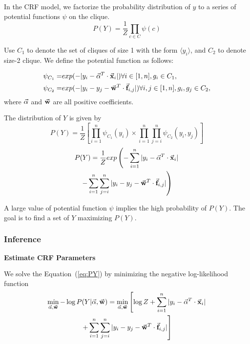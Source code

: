In the CRF model, we factorize the probability distribution of $y$ to a series of potential functions $\psi$ on the clique. 
\begin{equation}
	P(Y) = \frac{1}{Z} \prod_{ c \in C} \psi(c)
\end{equation}

Use $C_1$ to denote the set of cliques of size 1 with the form $\langle y_i \rangle$, and $C_2$ to denote size-2 clique. We define the potential function as follows:

\begin{align}
	\psi_{C_1} = &exp( - |y_i - \vec{\mathbf{\alpha}}^T \cdot \vec{\mathbf{x}}_i| )  \forall i \in [1, n], {g_i} \in C_1, \\
	\psi_{C_2} = & exp( - |y_i - y_j - \vec{\mathbf{w}}^T \cdot \vec{\mathbf{f}}_{i,j}| )  \forall i,j \in [1, n], {g_i, g_j} \in C_2, 
\end{align}
where $\vec{\mathbf{\alpha}}$ and $\vec{\mathbf{w}}$ are all positive coefficients.

The distribution of $Y$ is given by 
\begin{equation}
	P(Y) =  \frac{1}{Z} \left[ \prod_{i=1}^n \psi_{C_1}(y_i) \times \prod_{i=1}^n \prod_{j=i}^n \psi_{C_2}(y_i, y_j) \right]
\end{equation}
\begin{multline}
	P(Y) =  \frac{1}{Z} exp  \left( - \sum_{i=1}^n |y_i - \vec{\mathbf{\alpha}}^T \cdot \vec{\mathbf{x}}_i| \right. \\
          \left. - \sum_{i=1}^n\sum_{j=i}^n |y_i - y_j - \vec{\mathbf{w}}^T \cdot \vec{\mathbf{f}}_{i,j}| \right)
	\label{eq:PY}
\end{multline}


A large value of  potential function $\psi$ implies the high probability of $P(Y)$. The goal is to find a set of $Y$ maximizing $P(Y)$. 


\subsubsection{Inference}


\textbf{Estimate CRF Parameters}
\label{sec:estim}


We solve the Equation~(\ref{eq:PY}) by minimizing the negative log-likelihood function
\begin{multline}
\min_{\vec{\mathbf{\alpha}}, \vec{\mathbf{w}}} -\log P(Y|\vec{\mathbf{\alpha}}, \vec{\mathbf{w}}) = \min_{\vec{\mathbf{\alpha}}, \vec{\mathbf{w}}} \left[ \log Z + \sum_{i=1}^n |y_i - \vec{\mathbf{\alpha}}^T \cdot \vec{\mathbf{x}}_i| \right. \\
\left.  + \sum_{i=1}^n\sum_{j=i}^n |y_i - y_j - \vec{\mathbf{w}}^T \cdot \vec{\mathbf{f}}_{i,j}| \right]
\end{multline}

